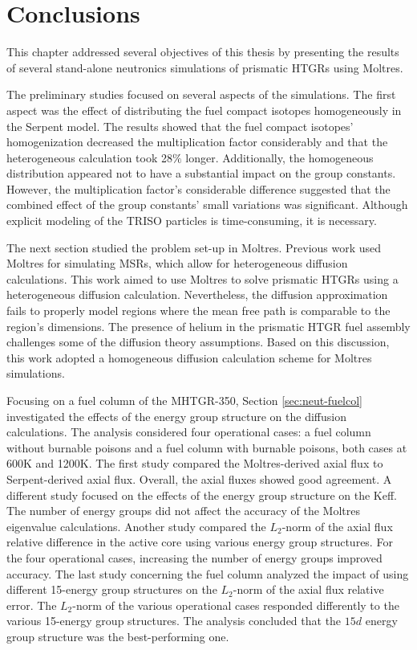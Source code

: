 \section{Conclusions}
\label{sec:neutr-conc}

This chapter addressed several objectives of this thesis by presenting the results of several stand-alone neutronics simulations of prismatic HTGRs using Moltres.

The preliminary studies focused on several aspects of the simulations.
The first aspect was the effect of distributing the fuel compact isotopes homogeneously in the Serpent model.
The results showed that the fuel compact isotopes' homogenization decreased the multiplication factor considerably and that the heterogeneous calculation took 28$\%$ longer.
Additionally, the homogeneous distribution appeared not to have a substantial impact on the group constants.
However, the multiplication factor's considerable difference suggested that the combined effect of the group constants’ small variations was significant.
Although explicit modeling of the TRISO particles is time-consuming, it is necessary.

The next section studied the problem set-up in Moltres.
Previous work used Moltres for simulating MSRs, which allow for heterogeneous diffusion calculations.
This work aimed to use Moltres to solve prismatic HTGRs using a heterogeneous diffusion calculation.
Nevertheless, the diffusion approximation fails to properly model regions where the mean free path is comparable to the region's dimensions.
The presence of helium in the prismatic HTGR fuel assembly challenges some of the diffusion theory assumptions.
Based on this discussion, this work adopted a homogeneous diffusion calculation scheme for Moltres simulations.

Focusing on a fuel column of the MHTGR-350, Section \ref{sec:neut-fuelcol} investigated the effects of the energy group structure on the diffusion calculations.
The analysis considered four operational cases: a fuel column without burnable poisons and a fuel column with burnable poisons, both cases at 600K and 1200K.
The first study compared the Moltres-derived axial flux to Serpent-derived axial flux.
Overall, the axial fluxes showed good agreement.
A different study focused on the effects of the energy group structure on the \gls{Keff}.
The number of energy groups did not affect the accuracy of the Moltres eigenvalue calculations.
Another study compared the $L_2$-norm of the axial flux relative difference in the active core using various energy group structures.
For the four operational cases, increasing the number of energy groups improved accuracy.
The last study concerning the fuel column analyzed the impact of using different 15-energy group structures on the $L_2$-norm of the axial flux relative error.
The $L_2$-norm of the various operational cases responded differently to the various 15-energy group structures.
The analysis concluded that the $15d$ energy group structure was the best-performing one.

